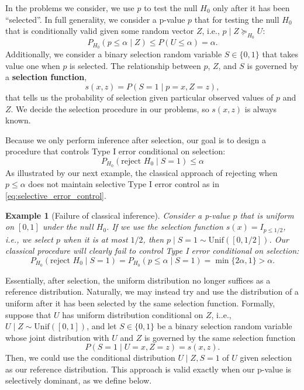 \documentclass{article}
\newtheorem{example}{Example}
\begin{document}
In the problems we consider, we use $p$ to test the null $H_0$ only after it has been ``selected''. In full generality, we consider a p-value $p$ that for testing the null $H_0$ that is conditionally valid given some random vector $Z$, i.e., $p \mid Z \succeq_{H_0} U$:
\begin{equation}
    \label{eq:valid_given_z}
    P_{H_0}(p \leq \alpha \mid Z) \leq P(U \leq \alpha)  = \alpha.
\end{equation}
Additionally, we consider a binary selection random variable $S \in \{0, 1\}$ that takes value one when $p$ is selected. The relationship between $p$, $Z$, and $S$ is governed by a \textbf{selection function},
\begin{equation*}
    s(x, z) = P(S = 1 \mid p = x, Z = z),
\end{equation*}
that tells us the probability of selection given particular observed values of $p$ and $Z$. We decide the selection procedure in our problems, so $s(x, z)$ is always known. 

Because we only perform inference after selection, our goal is to design a procedure that controls Type I error conditional on selection:
\begin{equation}
    \label{eq:selective_error_control}
    P_{H_0}(\text{reject } H_0 \mid S = 1) \leq \alpha 
\end{equation}
As illustrated by our next example, the classical approach of rejecting when $p \leq \alpha$ does not maintain selective Type I error control as in \eqref{eq:selective_error_control}. 

\begin{example}[Failure of classical inference]
 
Consider a p-value $p$ that is uniform on $[0, 1]$ under the null $H_0$. If we use the selection function $s(x) = I_{p \leq 1/2}$, i.e., we select $p$ when it is at most $1/2$, then $p \mid S=1 \sim \text{Unif}([0, 1/2])$. Our classical procedure will clearly fail to control Type I error conditional on selection:
\begin{equation*}
    P_{H_0}(\text{reject } H_0 \mid S=1) = P_{H_0}(p \leq \alpha \mid S=1) = \min \{2\alpha, 1\} > \alpha. 
\end{equation*}
\end{example}

Essentially, after selection, the uniform distribution no longer suffices as a reference distribution. Naturally, we may instead try and use the distribution of a uniform after it has been selected by the same selection function. Formally, suppose that $U$ has uniform distribution conditional on $Z$, i..e., $U \mid Z \sim \text{Unif}([0, 1])$, and let $S \in \{0, 1\}$ be a binary selection random variable whose joint distribution with $U$ and $Z$ is governed by the same selection function 
\begin{equation*}
     P(S = 1 \mid U = x, Z=z ) = s(x, z).
\end{equation*}
Then, we could use the conditional distribution $U \mid Z,  S = 1$ of $U$ given selection as our reference distribution. This approach is valid exactly when our p-value is selectively dominant, as we define below. 
\end{document}
